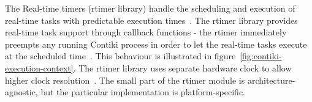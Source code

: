The Real-time timers (rtimer library) handle the scheduling and execution of
real-time tasks with predictable execution times~\cite{contiki-docs}.
The rtimer library provides real-time task support through callback functions -
the rtimer immediately preempts any running Contiki process in order to let the real-time tasks
execute at the scheduled time~\cite{contiki-wiki-timers}.
This behaviour is illustrated in figure~\ref{fig:contiki-execution-context}.
The rtimer library uses separate hardware clock
to allow higher clock resolution~\cite{contiki-wiki-timers}.
The small part of the rtimer module is architecture-agnostic,
but the particular implementation is platform-specific.
